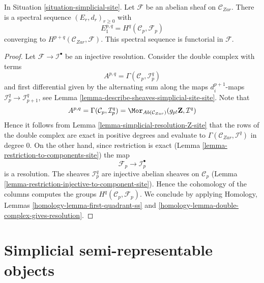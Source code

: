 \begin{lemma}
\label{lemma-simplicial-sheaf-cohomology-site}
In Situation \ref{situation-simplicial-site}. Let $\mathcal{F}$ be an abelian
sheaf on $\mathcal{C}_{Zar}$. There is a spectral sequence
$(E_r, d_r)_{r \geq 0}$ with
$$
E_1^{p, q} = H^q(\mathcal{C}_p, \mathcal{F}_p)
$$
converging to $H^{p + q}(\mathcal{C}_{Zar}, \mathcal{F})$.
This spectral sequence is functorial in $\mathcal{F}$.
\end{lemma}

\begin{proof}
Let $\mathcal{F} \to \mathcal{I}^\bullet$ be an injective resolution.
Consider the double complex with terms
$$
A^{p, q} = \Gamma(\mathcal{C}_p, \mathcal{I}^q_p)
$$
and first differential given by the alternating sum along the maps
$d^{p + 1}_i$-maps $\mathcal{I}_p^q \to \mathcal{I}_{p + 1}^q$, see
Lemma \ref{lemma-describe-sheaves-simplicial-site-site}. Note that
$$
A^{p, q} = \Gamma(\mathcal{C}_p, \mathcal{I}_p^q) =
\Mor_{\textit{Ab}(\mathcal{C}_{Zar})}(g_{p!}\mathbf{Z}, \mathcal{I}^q)
$$
Hence it follows from Lemma \ref{lemma-simplicial-resolution-Z-site}
that the rows of the double complex are exact in positive degrees
and evaluate to $\Gamma(\mathcal{C}_{Zar}, \mathcal{I}^q)$ in degree $0$.
On the other hand, since restriction is exact
(Lemma \ref{lemma-restriction-to-components-site})
the map
$$
\mathcal{F}_p \to \mathcal{I}_p^\bullet
$$
is a resolution. The sheaves $\mathcal{I}_p^q$ are injective
abelian sheaves on $\mathcal{C}_p$
(Lemma \ref{lemma-restriction-injective-to-component-site}).
Hence the cohomology of the columns computes the groups
$H^q(\mathcal{C}_p, \mathcal{F}_p)$. We conclude by applying
Homology, Lemmas \ref{homology-lemma-first-quadrant-ss} and
\ref{homology-lemma-double-complex-gives-resolution}.
\end{proof}







\section{Simplicial semi-representable objects}
\label{section-semi-representable}

